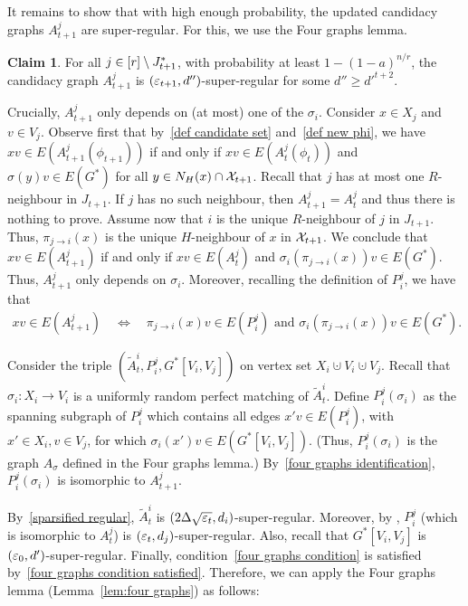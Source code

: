 \documentclass[10pt]{amsart}
\theoremstyle{definition}
\theoremstyle{claimstyle}
\newtheorem{claim}{Claim}
\theoremstyle{stepstyle}
\numberwithin{equation}{section}
\def\claimproof{\removelastskip\penalty55\medskip\noindent{\em Proof of claim: }}
\begin{document}
It remains to show that with high enough probability, the updated candidacy graphs $A_{t+1}^j$ are super-regular. For this, we use the Four graphs lemma.

\begin{NoHyper}
\begin{claim}\label{claim:candidate update}
For all $j\in [r]\setminus J_{t+1}^\ast$, with probability at least $1-(1-a)^{n/r}$, the candidacy graph $A_{t+1}^j$ is $({\varepsilon}_{t+1},d'')$-super-regular for some $d''\ge d'^{t+2}$.
\end{claim}
\end{NoHyper}

\claimproof
Crucially, $A_{t+1}^j$ only depends on (at most) one of the $\sigma_i$.
Consider $x\in X_j$ and $v\in V_j$. Observe first that by~\eqref{def candidate set} and~\eqref{def new phi}, we have $xv\in E(A_{t+1}^j (\phi_{t+1}))$ if and only if $xv\in E(A_{t}^j (\phi_{t}))$ and $\sigma(y)v\in E(G^\ast)$ for all $y\in N_H(x)\cap \mathcal{X}_{t+1}$.
Recall that $j$ has at most one $R$-neighbour in $J_{t+1}$. If $j$ has no such neighbour, then $A_{t+1}^j=A_{t}^j$ and thus there is nothing to prove. Assume now that $i$ is the unique $R$-neighbour of $j$ in $J_{t+1}$. Thus, $\pi_{j\to i}(x)$ is the unique $H$-neighbour of $x$ in $\mathcal{X}_{t+1}$. We conclude that $xv\in E(A_{t+1}^j)$ if and only if $xv\in E(A_{t}^j)$ and $\sigma_i(\pi_{j\to i}(x))v\in E(G^\ast)$. Thus, $A_{t+1}^j$ only depends on $\sigma_i$. Moreover, recalling the definition of $P^j_i$, we have that
\begin{align}
xv\in E(A_{t+1}^j) \quad \Leftrightarrow \quad \pi_{j\to i}(x)v \in E(P^j_i) \mbox{ and } \sigma_i(\pi_{j\to i}(x))v\in E(G^\ast). \label{four graphs identification}
\end{align}

Consider the triple $(\tilde{A}_t^i,P^j_i,G^\ast[V_i,V_j])$ on vertex set $X_i\cupdot V_i \cupdot V_j$. Recall that $\sigma_i\colon X_i\to V_i$ is a uniformly random perfect matching of $\tilde{A}_t^i$.
Define $P^j_i(\sigma_i)$ as the spanning subgraph of $P^j_i$ which contains all edges $x'v\in E(P^j_i)$, with $x'\in X_i,v\in V_j$, for which $\sigma_i(x')v\in E(G^\ast[V_i,V_j])$. (Thus, $P^j_i(\sigma_i)$ is the graph $A_\sigma$ defined in the Four graphs lemma.) By~\eqref{four graphs identification}, $P^j_i(\sigma_i)$ is isomorphic to $A_{t+1}^j$.

By~\eqref{sparsified regular}, $\tilde{A}_t^i$ is $(2\Delta \sqrt{{\varepsilon}_t},d_i)$-super-regular. Moreover, by , $P^j_i$ (which is isomorphic to $A_t^j$) is $({\varepsilon}_t,d_j)$-super-regular. Also, recall that $G^\ast[V_i,V_j]$ is $({\varepsilon}_0,d')$-super-regular. Finally, condition~\eqref{four graphs condition} is satisfied by~\eqref{four graphs condition satisfied}. Therefore, we can apply the Four graphs lemma (Lemma~\ref{lem:four graphs}) as follows:
\end{document}

